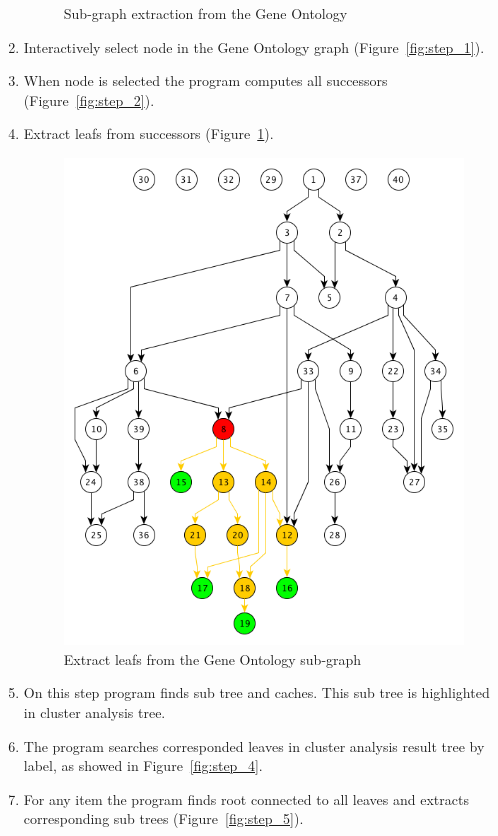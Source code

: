 \begin{enumerate}
\begin{figure}[h!]
{}
\caption{Sub-graph extraction from the Gene Ontology}
\end{figure}

\item Interactively select node in the Gene Ontology graph (Figure~\ref{fig:step_1}).

\item When node is selected the program computes all successors (Figure~\ref{fig:step_2}).

\item Extract leafs from successors (Figure~\ref{fig:step_3}).

\begin{figure}[h!]
\centering
\includegraphics[scale=0.5]{pictures/subgraph_extraction_algorithm_step_3.png}
\caption{Extract leafs from the Gene Ontology sub-graph}
\label{fig:step_3}
\end{figure}

\item On this step program finds sub tree and caches. This sub tree is highlighted in cluster analysis tree.

\item The program searches corresponded leaves in cluster analysis result tree by label, as showed in Figure~\ref{fig:step_4}.

\item For any item the program finds root connected to all leaves and extracts corresponding sub trees (Figure~\ref{fig:step_5}).
\end{enumerate}

